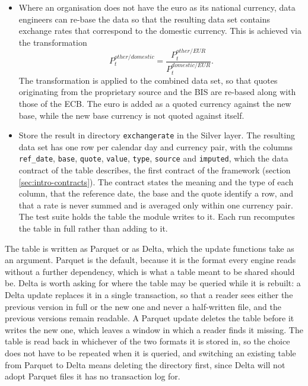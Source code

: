 \begin{itemize}
	Which rows are filled is recorded in the column \verb|imputed|, which is true on a day whose rate was carried from an earlier quote and false on a day a source quoted. Wherever the ECB is the source, the imputed days are the weekends and the TARGET closing days, on which it does not publish; any other day without a quote is marked as well, whatever the reason for the gap, since a carried rate is imputed either way. A quote a source makes on a weekend is not imputed, and a re-based cross rate is imputed where either of the two euro rates it is computed from is. The column lets an analysis restrict itself to quoted rates, or see how much of a result rests on carried ones.
	\item Where an organisation does not have the euro as its national currency, data engineers can re-base the data so that the resulting data set contains exchange rates that correspond to the domestic currency. This is achieved via the transformation
	$$P^{other/domestic}_t = \frac{P^{other/EUR}_t}{P^{domestic/EUR}_t}.$$
	The transformation is applied to the combined data set, so that quotes originating from the proprietary source and the BIS are re-based along with those of the ECB. The euro is added as a quoted currency against the new base, while the new base currency is not quoted against itself.
	\item Store the result in directory \verb|exchangerate| in the Silver layer. The resulting data set has one row per calendar day and currency pair, with the columns \verb|ref_date|, \verb|base|, \verb|quote|, \verb|value|, \verb|type|, \verb|source| and \verb|imputed|, which the data contract of the table describes, the first contract of the framework (section \ref{sec:intro-contracts}). The contract states the meaning and the type of each column, that the reference date, the base and the quote identify a row, and that a rate is never summed and is averaged only within one currency pair. The test suite holds the table the module writes to it. Each run recomputes the table in full rather than adding to it.
\end{itemize}

The table is written as Parquet or as Delta, which the update functions take as an argument. Parquet is the default, because it is the format every engine reads without a further dependency, which is what a table meant to be shared should be. Delta is worth asking for where the table may be queried while it is rebuilt: a Delta update replaces it in a single transaction, so that a reader sees either the previous version in full or the new one and never a half-written file, and the previous versions remain readable. A Parquet update deletes the table before it writes the new one, which leaves a window in which a reader finds it missing. The table is read back in whichever of the two formats it is stored in, so the choice does not have to be repeated when it is queried, and switching an existing table from Parquet to Delta means deleting the directory first, since Delta will not adopt Parquet files it has no transaction log for.

